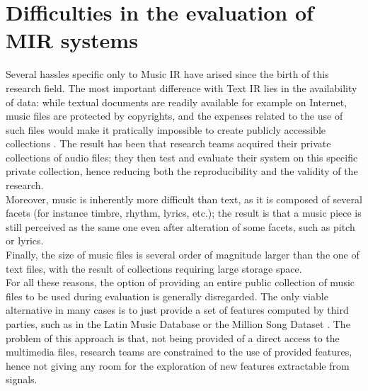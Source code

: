 \section{Difficulties in the evaluation of MIR systems}
Several hassles specific only to Music IR have arised since the birth of this research field. The most important difference with Text IR lies in the availability of data: while textual documents are readily available for example on Internet, music files are protected by copyrights, and the expenses related to the use of such files would make it pratically impossible to create publicly accessible collections \cite{gomez14}. The result has been that research teams acquired their private collections of audio files; they then test and evaluate their system on this specific private collection, hence reducing both the reproducibility and the validity of the research. \\
Moreover, music is inherently more difficult than text, as it is composed of several facets (for instance timbre, rhythm, lyrics, etc.); the result is that a music piece is still perceived as the same one even after alteration of some facets, such as pitch or lyrics. \\ Finally, the size of music files is several order of magnitude larger than the one of text files, with the result of collections requiring large storage space.  \\
For all these reasons, the option of providing an entire public collection of music files to be used during evaluation is generally disregarded. The only viable alternative in many cases is to just provide a set of features computed by third parties, such as in the Latin Music Database \cite{latin08} or the Million Song Dataset \cite{million11}. The problem of this approach is that, not being provided of a direct access to the multimedia files, research teams are constrained to the use of provided features, hence not giving any room for the exploration of new features extractable from signals. 

